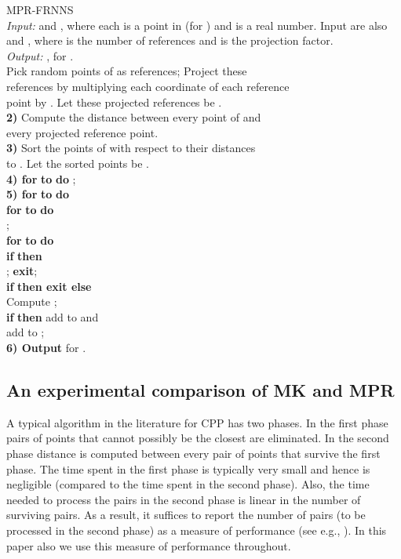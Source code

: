 \documentclass{article}
\theoremstyle{definition}
\theoremstyle{remark}
\begin{document}
 {\sf MPR-FRNNS}\\
{\em Input:}  and , where each  is a point in  (for ) and  is a real number. Input are also  and , where  is the number of references and  is the projection factor.\\
{\em Output:} , for .\\

\vspace{-0.15in}
 Pick  random points of  as references; Project these \\
references by multiplying each coordinate of each reference\\
point by . Let these projected references be .\\
 {\bf 2)} Compute the distance between every point of  and \\
 every projected reference point.\\
{\bf 3)} Sort the points of  with respect to their distances\\
 to . Let the sorted points be
.\\
{\bf 4) for}  {\bf to}  {\bf do} ;\\
{\bf 5) for}  {\bf to}  {\bf do}\\
\hspace*{0.4in} {\bf for}  {\bf to}  {\bf do}\\
\hspace*{0.7in} ;\\
\hspace*{0.7in} {\bf for}  {\bf to}  {\bf do}\\
\hspace*{0.9in} {\bf if}  {\bf then}\\
\hspace*{1.1in} ; {\bf exit};\\
\hspace*{0.7in} {\bf if}  {\bf then exit else}\\
\hspace*{0.9in} Compute ; \\
\hspace*{0.9in} {\bf if}  {\bf then} add  to  and \\
\hspace*{0.9in} add  to ;\\
{\bf 6) Output}  for .

\subsection{An experimental comparison of MK and MPR}
A typical algorithm in the literature for CPP has two phases. In the first phase pairs of points that cannot possibly be the closest are eliminated. In the second phase distance is computed between every pair of points that survive the first phase. The time spent in the first phase is typically very small and hence is negligible (compared to the time spent in the second phase). Also, the time needed to process the pairs in the second phase is linear in the number of surviving pairs. As a result, it suffices to report the number of pairs (to be processed in the second phase) as a measure of performance (see e.g., \cite{PBK11}). In this paper also we use this measure of performance throughout.
\end{document}
